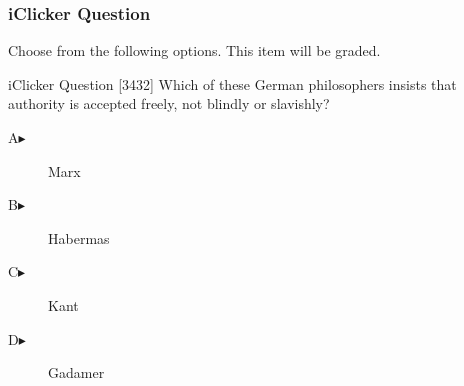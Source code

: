 \begin{frame}
  \frametitle{iClicker Question}
Choose from the following options. This item will be graded.
\begin{block}{iClicker Question}
[3432]   Which of these German philosophers insists that authority is
  accepted freely, not blindly or slavishly?
\end{block}
\begin{description}
\item[A\hspace{.2in}$\blacktriangleright$] Marx
\item[B\hspace{.2in}$\blacktriangleright$] Habermas
\item[C\hspace{.2in}$\blacktriangleright$] Kant
\item[D\hspace{.2in}$\blacktriangleright$] Gadamer
\end{description}
\end{frame}

